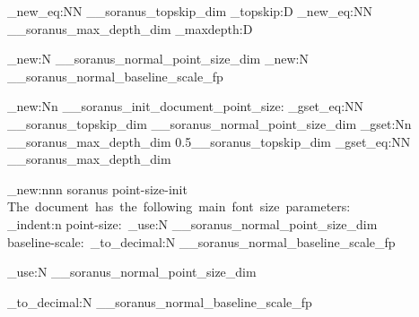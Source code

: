%
%
%
% 
%


%

%

\cs_new_eq:NN \g__soranus_topskip_dim \tex_topskip:D
\cs_new_eq:NN \g__soranus_max_depth_dim \tex_maxdepth:D

\dim_new:N \g__soranus_normal_point_size_dim
\fp_new:N \g__soranus_normal_baseline_scale_fp


%

\cs_new:Nn \__soranus_init_document_point_size:
  {
    \dim_gset_eq:NN \g__soranus_topskip_dim \g__soranus_normal_point_size_dim
    \dim_gset:Nn \g__soranus_max_depth_dim { 0.5\g__soranus_topskip_dim }
    \dim_gset_eq:NN \@maxdepth \g__soranus_max_depth_dim
  }


%

\msg_new:nnn { soranus } { point-size-init }
  {
    The~document~has~the~following~main~font~size~parameters:\\
    \iow_indent:n
      {
        point-size:~\dim_use:N \g__soranus_normal_point_size_dim\\
        baseline-scale:~\fp_to_decimal:N \g__soranus_normal_baseline_scale_fp
      }
  }



%

\NewDocumentCommand \NormalPointSize { }
  { \dim_use:N \g__soranus_normal_point_size_dim }

\NewDocumentCommand \NormalBaselineScale {}
  { \fp_to_decimal:N \g__soranus_normal_baseline_scale_fp }





